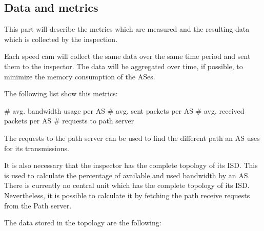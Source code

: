 \documentclass[thesis.tex]{subfiles}
\begin{document}



\subsection{Data and metrics}
This part will describe the metrics which are measured and the resulting data which is collected by the inspection.

Each speed cam will collect the same data over the same time period and sent them to the inspector. The data will be aggregated over time, if possible, to minimize the memory consumption of the ASes.

The following list show this metrics:
\begin{easylist}
    \MyListProperties
    # avg. bandwidth usage per AS
    # avg. sent packets per AS
    # avg. received packets per AS
    # requests to path server 
\end{easylist}

The requests to the path server can be used to find the different path an AS uses for its transmissions. 

It is also necessary that the inspector has the complete topology of its ISD. This is used to calculate the percentage of available and used bandwidth by an AS. There is currently no central unit which has the complete topology of its ISD. Nevertheless, it is possible to calculate it by fetching the path receive requests from the Path server. 

The data stored in the topology are the following:
\end{document}
